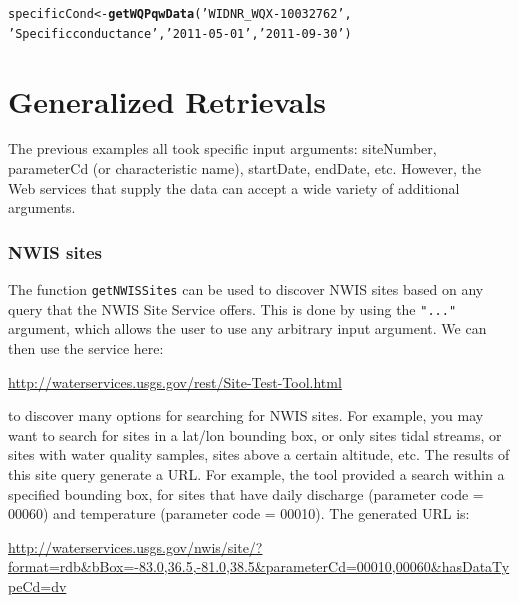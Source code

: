 \documentclass[a4paper,11pt]{article}\usepackage[]{graphicx}\usepackage[]{color}
\makeatletter
\newcommand{\hlstr}[1]{\textcolor[rgb]{0.192,0.494,0.8}{#1}}%
\newcommand{\hlstd}[1]{\textcolor[rgb]{0.345,0.345,0.345}{#1}}%
\newcommand{\hlkwb}[1]{\textcolor[rgb]{0.69,0.353,0.396}{#1}}%
\newcommand{\hlkwd}[1]{\textcolor[rgb]{0.737,0.353,0.396}{\textbf{#1}}}%
\newenvironment{kframe}{%
 \def\at@end@of@kframe{}%
 \ifinner\ifhmode%
  \def\at@end@of@kframe{\end{minipage}}%
  \begin{minipage}{\columnwidth}%
 \fi\fi%
 \def\FrameCommand##1{\hskip\@totalleftmargin \hskip-\fboxsep
 \colorbox{shadecolor}{##1}\hskip-\fboxsep
     \hskip-\linewidth \hskip-\@totalleftmargin \hskip\columnwidth}%
 \MakeFramed {\advance\hsize-\width
   \@totalleftmargin\z@ \linewidth\hsize
   \@setminipage}}%
 {\par\unskip\endMakeFramed%
 \at@end@of@kframe}
\newenvironment{knitrout}{}{} %
\makeatother
\begin{document}
\begin{knitrout}
\color{fgcolor}\begin{kframe}
\begin{alltt}
\hlstd{specificCond} \hlkwb{<-} \hlkwd{getWQPqwData}\hlstd{(}\hlstr{'WIDNR_WQX-10032762'}\hlstd{,}
                \hlstr{'Specific conductance'}\hlstd{,}\hlstr{'2011-05-01'}\hlstd{,}\hlstr{'2011-09-30'}\hlstd{)}
\end{alltt}
\end{kframe}
\end{knitrout}


\FloatBarrier

\section{Generalized Retrievals}
\label{sec:general}
The previous examples all took specific input arguments: siteNumber, parameterCd (or characteristic name), startDate, endDate, etc. However, the Web services that supply the data can accept a wide variety of additional arguments. 

\subsubsection{NWIS sites}
\label{sec:NWISGenSite}
The function \texttt{getNWISSites} can be used to discover NWIS sites based on any query that the NWIS Site Service offers. This is done by using the \texttt{"..."} argument, which allows the user to use any arbitrary input argument. We can then use the service here:

\url{http://waterservices.usgs.gov/rest/Site-Test-Tool.html}

to discover many options for searching for NWIS sites. For example, you may want to search for sites in a lat/lon bounding box, or only sites tidal streams, or sites with water quality samples, sites above a certain altitude, etc. The results of this site query generate a URL. For example, the tool provided a search within a specified bounding box, for sites that have daily discharge (parameter code = 00060) and temperature (parameter code = 00010). The generated URL is:

\url{http://waterservices.usgs.gov/nwis/site/?format=rdb&bBox=-83.0,36.5,-81.0,38.5&parameterCd=00010,00060&hasDataTypeCd=dv}
\end{document}
